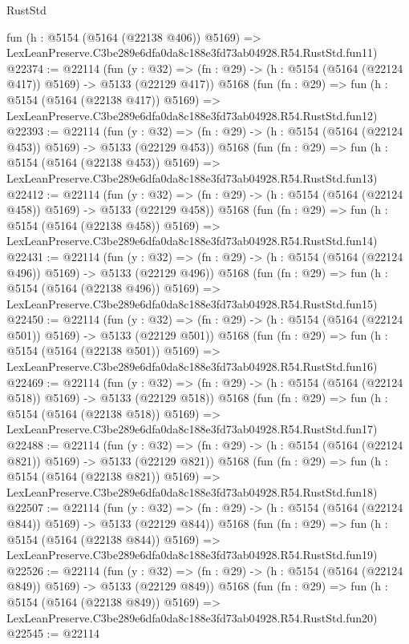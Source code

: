 \begin{lexlean}{RustStd}
\begin{coremodule}
    fun (h : @5154 (@5164 (@22138 @406)) @5169) =>
    LexLeanPreserve.C3be289e6dfa0da8c188e3fd73ab04928.R54.RustStd.fun11)
@22374 := @22114
    (fun (y : @32) => (fn : @29) -> (h : @5154 (@5164 (@22124 @417)) @5169) -> @5133 (@22129 @417))
    @5168
    (fun (fn : @29) =>
    fun (h : @5154 (@5164 (@22138 @417)) @5169) =>
    LexLeanPreserve.C3be289e6dfa0da8c188e3fd73ab04928.R54.RustStd.fun12)
@22393 := @22114
    (fun (y : @32) => (fn : @29) -> (h : @5154 (@5164 (@22124 @453)) @5169) -> @5133 (@22129 @453))
    @5168
    (fun (fn : @29) =>
    fun (h : @5154 (@5164 (@22138 @453)) @5169) =>
    LexLeanPreserve.C3be289e6dfa0da8c188e3fd73ab04928.R54.RustStd.fun13)
@22412 := @22114
    (fun (y : @32) => (fn : @29) -> (h : @5154 (@5164 (@22124 @458)) @5169) -> @5133 (@22129 @458))
    @5168
    (fun (fn : @29) =>
    fun (h : @5154 (@5164 (@22138 @458)) @5169) =>
    LexLeanPreserve.C3be289e6dfa0da8c188e3fd73ab04928.R54.RustStd.fun14)
@22431 := @22114
    (fun (y : @32) => (fn : @29) -> (h : @5154 (@5164 (@22124 @496)) @5169) -> @5133 (@22129 @496))
    @5168
    (fun (fn : @29) =>
    fun (h : @5154 (@5164 (@22138 @496)) @5169) =>
    LexLeanPreserve.C3be289e6dfa0da8c188e3fd73ab04928.R54.RustStd.fun15)
@22450 := @22114
    (fun (y : @32) => (fn : @29) -> (h : @5154 (@5164 (@22124 @501)) @5169) -> @5133 (@22129 @501))
    @5168
    (fun (fn : @29) =>
    fun (h : @5154 (@5164 (@22138 @501)) @5169) =>
    LexLeanPreserve.C3be289e6dfa0da8c188e3fd73ab04928.R54.RustStd.fun16)
@22469 := @22114
    (fun (y : @32) => (fn : @29) -> (h : @5154 (@5164 (@22124 @518)) @5169) -> @5133 (@22129 @518))
    @5168
    (fun (fn : @29) =>
    fun (h : @5154 (@5164 (@22138 @518)) @5169) =>
    LexLeanPreserve.C3be289e6dfa0da8c188e3fd73ab04928.R54.RustStd.fun17)
@22488 := @22114
    (fun (y : @32) => (fn : @29) -> (h : @5154 (@5164 (@22124 @821)) @5169) -> @5133 (@22129 @821))
    @5168
    (fun (fn : @29) =>
    fun (h : @5154 (@5164 (@22138 @821)) @5169) =>
    LexLeanPreserve.C3be289e6dfa0da8c188e3fd73ab04928.R54.RustStd.fun18)
@22507 := @22114
    (fun (y : @32) => (fn : @29) -> (h : @5154 (@5164 (@22124 @844)) @5169) -> @5133 (@22129 @844))
    @5168
    (fun (fn : @29) =>
    fun (h : @5154 (@5164 (@22138 @844)) @5169) =>
    LexLeanPreserve.C3be289e6dfa0da8c188e3fd73ab04928.R54.RustStd.fun19)
@22526 := @22114
    (fun (y : @32) => (fn : @29) -> (h : @5154 (@5164 (@22124 @849)) @5169) -> @5133 (@22129 @849))
    @5168
    (fun (fn : @29) =>
    fun (h : @5154 (@5164 (@22138 @849)) @5169) =>
    LexLeanPreserve.C3be289e6dfa0da8c188e3fd73ab04928.R54.RustStd.fun20)
@22545 := @22114

\end{coremodule}
\end{lexlean}
